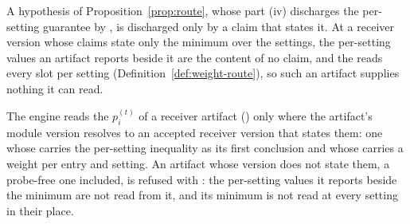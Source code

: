 
A hypothesis of Proposition~\ref{prop:route}, whose part (iv) discharges the
per-setting guarantee by , is discharged
only by a claim that states it. At a receiver
version whose claims state only the minimum over the settings, the
per-setting values an artifact reports beside it are the content of no
claim, and the  reads every slot per setting
(Definition~\ref{def:weight-route}), so such an artifact supplies nothing it
can read.

\begin{requirement}\label{req:supplier-version}
The engine reads the 
$p^{(t)}_i$ of a receiver artifact () only where
the artifact's module version resolves to an accepted receiver version that
states them: one whose  carries the
per-setting inequality as its first conclusion and whose
 carries a weight per entry and setting. An artifact
whose version does not state them, a probe-free one included, is refused with
: the per-setting values it reports beside
the minimum are not read from it, and its minimum is not read at every
setting in their place.
\end{requirement}
